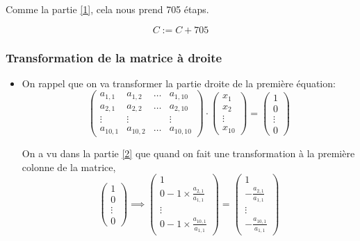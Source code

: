 \documentclass{article}
\begin{document}
Comme la partie \ref{1}, cela nous prend 705 étaps.
\begin{tcolorbox}
        \[
        C := C + 705
        \]
        \end{tcolorbox}
        \subsubsection{Transformation de la matrice à droite}
\begin{itemize}
    \item On rappel que on va transformer la partie droite de la première équation: 
    \[\begin{pmatrix} a_{1,1} & a_{1,2} & \ldots & a_{1,10} \\
                a_{2,1} & a_{2,2} & \ldots & a_{2,10} \\
                \vdots & \vdots & & \vdots\\
                a_{10,1} & a_{10,2} & \ldots & a_{10,10}
            \end{pmatrix}\cdot\begin{pmatrix} 
            x_1\\
            x_2\\
            \vdots\\
            x_{10}
            \end{pmatrix}=\begin{pmatrix} 
            1\\
            0\\
            \vdots\\
            0
            \end{pmatrix}
    \]

On a vu dans la partie \ref{2} que quand on fait une transformation à la première colonne de la matrice, 
\[\begin{pmatrix} 
            1\\
            0\\
            \vdots\\
            0
            \end{pmatrix} \implies \begin{pmatrix}
 1\\
 0-1\times\frac{a_{2,1}}{a_{1,1}} \\
 \vdots\\
 0-1\times\frac{a_{10,1}}{a_{1,1}}
\end{pmatrix}=
\begin{pmatrix}
 1\\
 -\frac{a_{2,1}}{a_{1,1}} \\
 \vdots\\
-\frac{a_{10,1}}{a_{1,1}}
\end{pmatrix}
\]


\end{itemize}
\end{document}
